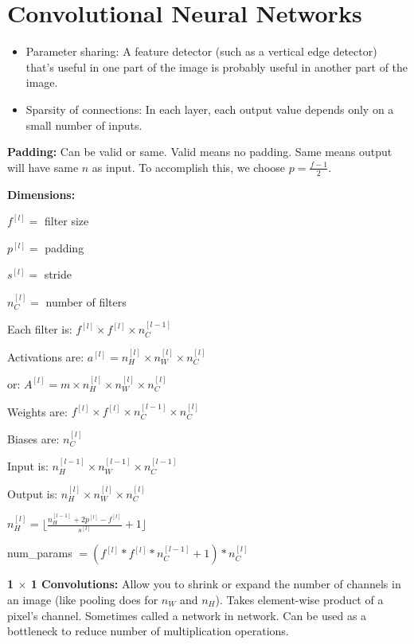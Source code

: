 \section{Convolutional Neural Networks}

\begin{itemize}[wide, labelwidth=!, labelindent=0pt]
\itemsep0em 
    \item Parameter sharing: A feature detector (such as a vertical edge detector) that’s useful in one part of the image is probably useful in another part of the image.
    \item Sparsity of connections: In each layer, each output value depends only on a small number of inputs. \vspace*{-\baselineskip}
\end{itemize}

\textbf{Padding:} Can be valid or same. Valid means no padding. Same means output will have same $n$ as input. To accomplish this, we choose $p = \frac{f-1}{2}$.

\textbf{Dimensions:}

$f^{[l]} = $ filter size

$p^{[l]} = $ padding

$s^{[l]} = $ stride

$n_C^{[l]} = $ number of filters

Each filter is: $f^{[l]} \times f^{[l]} \times n_C^{[l-1]}$

Activations are: $a^{[l]} = n_H^{[l]} \times n_W^{[l]} \times n_C^{[l]}$

or: $A^{[l]} = m \times n_H^{[l]} \times n_W^{[l]} \times n_C^{[l]}$

Weights are: $f^{[l]} \times f^{[l]} \times n_C^{[l-1]} \times n_C^{[l]}$

Biases are: $n_C^{[l]}$

Input is: $n_H^{[l-1]} \times n_W^{[l-1]} \times n_C^{[l-1]}$

Output is: $n_H^{[l]} \times n_W^{[l]} \times n_C^{[l]}$

$n_H^{[l]} = \lfloor \frac{n_H^{[l-1]} + 2p^{[l]} - f^{[l]}}{s^{[l]}} + 1 \rfloor$

num\_params $= (f^{[l]} * f^{[l]} * n_C^{[l-1]} + 1) * n_C^{[l]}$

\textbf{1 $\times$ 1 Convolutions: } Allow you to shrink or expand the number of channels in an image (like pooling does for $n_W$ and $n_H$). Takes element-wise product of a pixel's channel. Sometimes called a network in network. Can be used as a bottleneck to reduce number of multiplication operations.

